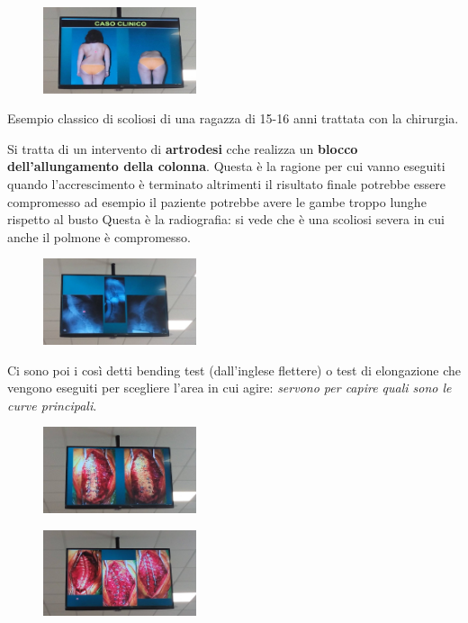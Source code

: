 \begin{figure}[!ht]
\centering
\includegraphics[width=0.4\textwidth]{013/image11.jpeg}
\end{figure}

Esempio classico di scoliosi di una ragazza di 15-16 anni trattata con la chirurgia.

Si tratta di un intervento di \textbf{artrodesi} cche realizza un \textbf{blocco dell'allungamento della colonna}. Questa è la ragione per cui vanno eseguiti quando l'accrescimento è terminato altrimenti il risultato finale potrebbe essere compromesso ad esempio il paziente potrebbe avere le gambe troppo lunghe rispetto al busto Questa è la
radiografia: si vede che è una scoliosi severa in cui anche il polmone è compromesso.

\begin{figure}[!ht]
\centering
\includegraphics[width=0.4\textwidth]{013/image12.jpeg}
\end{figure}

Ci sono poi i così detti bending test (dall'inglese flettere) o test di elongazione che vengono eseguiti per scegliere l'area in cui agire: \emph{servono per capire quali sono le curve principali}.

\begin{figure}[!ht]
\centering
\includegraphics[width=0.4\textwidth]{013/image13.jpeg}
\end{figure}

\begin{figure}[!ht]
\centering
\includegraphics[width=0.4\textwidth]{013/image14.jpeg}
\end{figure}

